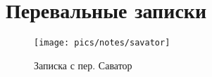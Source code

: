 \section{Перевальные записки}

\begin{figure}[h!]
	\centering
	\texttt{[image: pics/notes/savator]}
	\caption{Записка с пер. Саватор}
	\label{fig:savator}
\end{figure}


\clearpage